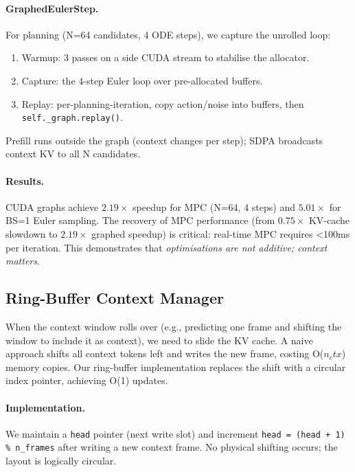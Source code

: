 \documentclass[letterpaper,twocolumn,10pt]{article}
\begin{document}
\paragraph{GraphedEulerStep.}
For planning (N=64 candidates, 4 ODE steps), we capture the unrolled
loop:
\begin{enumerate}
  \item Warmup: 3 passes on a side CUDA stream to stabilise the allocator.
  \item Capture: the 4-step Euler loop over pre-allocated buffers.
  \item Replay: per-planning-iteration, copy action/noise into buffers,
        then \texttt{self.\_graph.replay()}.
\end{enumerate}
Prefill runs outside the graph (context changes per step);
SDPA broadcasts context KV to all N candidates.

\paragraph{Results.}
CUDA graphs achieve $2.19\times$ speedup for MPC (N=64, 4 steps) and
$5.01\times$ for BS=1 Euler sampling. The recovery of MPC performance
(from $0.75\times$ KV-cache slowdown to $2.19\times$ graphed speedup) is
critical: real-time MPC requires <100ms per iteration. This demonstrates
that \emph{optimisations are not additive; context matters}.

\subsection{Ring-Buffer Context Manager}

When the context window rolls over (e.g., predicting one frame and
shifting the window to include it as context), we need to slide the KV
cache.  A naive approach shifts all context tokens left and writes the
new frame, costing O($n_ctx$) memory copies.  Our ring-buffer
implementation replaces the shift with a circular index pointer, achieving
O(1) updates.

\paragraph{Implementation.}
We maintain a \texttt{head} pointer (next write slot) and increment
\texttt{head = (head + 1) \% n\_frames} after writing a new context
frame.  No physical shifting occurs; the layout is logically circular.
\end{document}
